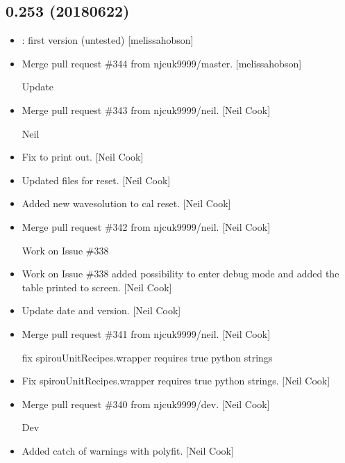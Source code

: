 \documentclass[a4paper,10pt,english]{report}
\begin{document}
\subsection{0.253 (2018\sphinxhyphen{}06\sphinxhyphen{}22)}
\label{\detokenize{misc/changelog:id432}}\begin{itemize}
\item {} 
: first version (untested) {[}melissa\sphinxhyphen{}hobson{]}

\item {} 
Merge pull request \#344 from njcuk9999/master. {[}melissa\sphinxhyphen{}hobson{]}

Update

\item {} 
Merge pull request \#343 from njcuk9999/neil. {[}Neil Cook{]}

Neil

\item {} 
Fix to print out. {[}Neil Cook{]}

\item {} 
Updated files for reset. {[}Neil Cook{]}

\item {} 
Added new wavesolution to cal reset. {[}Neil Cook{]}

\item {} 
Merge pull request \#342 from njcuk9999/neil. {[}Neil Cook{]}

Work on Issue \#338

\item {} 
Work on Issue \#338 \sphinxhyphen{} added possibility to enter debug mode and added
the table printed to screen. {[}Neil Cook{]}

\item {} 
Update date and version. {[}Neil Cook{]}

\item {} 
Merge pull request \#341 from njcuk9999/neil. {[}Neil Cook{]}

fix \sphinxhyphen{} spirouUnitRecipes.wrapper requires true python strings

\item {} 
Fix \sphinxhyphen{} spirouUnitRecipes.wrapper requires true python strings. {[}Neil
Cook{]}

\item {} 
Merge pull request \#340 from njcuk9999/dev. {[}Neil Cook{]}

Dev

\item {} 
Added catch of warnings with polyfit. {[}Neil Cook{]}


\end{itemize}
\end{document}
